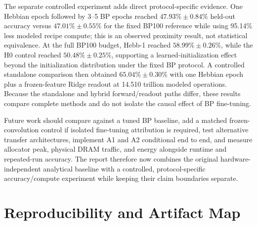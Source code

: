 \documentclass{article}
\begin{document}
    {\color{red}The separate controlled experiment adds direct protocol-specific evidence. One Hebbian epoch followed by 3--5 BP epochs reached $47.93\% \pm 0.84\%$ held-out accuracy versus $47.01\% \pm 0.55\%$ for the fixed BP100 reference while using 95.14\% less modeled recipe compute; this is an observed proximity result, not statistical equivalence. At the full BP100 budget, Hebb-1 reached $58.99\% \pm 0.26\%$, while the H0 control reached $50.48\% \pm 0.25\%$, supporting a learned-initialization effect beyond the initialization distribution under the fixed BP protocol. A controlled standalone comparison then obtained $65.04\% \pm 0.30\%$ with one Hebbian epoch plus a frozen-feature Ridge readout at 14.510 trillion modeled operations. Because the standalone and hybrid forward/readout paths differ, these results compare complete methods and do not isolate the causal effect of BP fine-tuning.}

    {\color{red}Future work should compare against a tuned BP baseline, add a matched frozen-convolution control if isolated fine-tuning attribution is required, test alternative transfer architectures, implement A1 and A2 conditional end to end, and measure allocator peak, physical DRAM traffic, and energy alongside runtime and repeated-run accuracy. The report therefore now combines the original hardware-independent analytical baseline with a controlled, protocol-specific accuracy/compute experiment while keeping their claim boundaries separate.}
    
    \section*{Reproducibility and Artifact Map}
    
\end{document}
